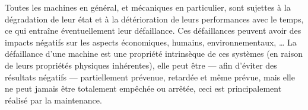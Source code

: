 \begin{comment}
There is a disagreement in the literature on this classification, some researchers put CBM under preventive maintenance (alongside time-based maintenance) while others consider it a distinct form (predictive maintenance) \cite{Shin2015}. The difference in taxonomy isn't of a real interest to the current discussion.

A new field that emerged recently is Prognostics and Health Management (PHM). PHM has emerged as an essential approach for achieving competitive advantages in the global market by improving reliability, maintainability, safety, and affordability. Concepts and components in PHM have been developed separately in many areas such as mechanical engineering, electrical engineering, and statistical science, under varied names \cite{Tsui2015}.

Whereas CBM focuses on the monitoring of the system, PHM is a more integrated approach that aims to provide guidelines for managing the health of the system. In that way, it is a philosophy to perform Life Cycle Management (LCM), with a strong focus on the predictability (i.e. prognostics) of failures and maintenance. This is generally achieved by adopting some monitoring strategy, which may be a CM technique \cite{Tinga2014}.

PHM is acting on a somewhat higher level than CBM, since it has a clear ambition to enable health management. The latter is an activity related to Life Cycle Management (LCM), which means that an approach is followed to optimize all (maintenance) activities during the complete life cycle of the asset. This includes the selection of an appropriate maintenance policy, defining the maintenance interval length and deciding on the moment an asset should be discarded. CBM doesn't provide that extensive LCM support. The PHM field prescribes neither a specific maintenance concept nor a monitoring strategy. However, in typical PHM studies, CBM or other maintenance policies are adopted and in many cases CM techniques are applied \cite{Tinga2014}.
\end{comment}

Toutes les machines en général, et mécaniques en particulier, sont sujettes à la dégradation de leur état et à la détérioration de leurs performances avec le temps, ce qui entraîne éventuellement leur défaillance. Ces défaillances peuvent avoir des impacts négatifs sur les aspects économiques, humains, environnementaux, …
La défaillance d’une machine est une propriété intrinsèque de ces systèmes (en raison de leurs propriétés physiques inhérentes), elle peut être — afin d’éviter des résultats négatifs — partiellement prévenue, retardée et même prévue, mais elle ne peut jamais être totalement empêchée ou arrêtée, ceci est principalement réalisé par la maintenance.


